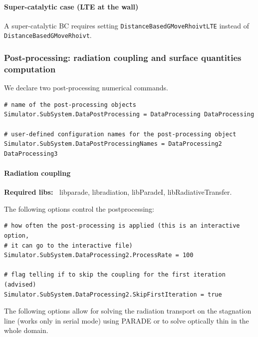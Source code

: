 \documentclass[11pt]{article}
\begin{document}
\paragraph{Super-catalytic case (LTE at the wall)}

A super-catalytic BC requires setting {\tt DistanceBasedGMoveRhoivtLTE} instead of  
{\tt DistanceBasedGMoveRhoivt}.

\subsubsection{Post-processing: radiation coupling and surface quantities computation}

We declare two post-processing numerical commands.

\begin{verbatim}
# name of the post-processing objects
Simulator.SubSystem.DataPostProcessing = DataProcessing DataProcessing

# user-defined configuration names for the post-processing object 
Simulator.SubSystem.DataPostProcessingNames = DataProcessing2 DataProcessing3
\end{verbatim}

\paragraph{Radiation coupling}

{\bf Required libs:~} libparade, libradiation, libParadeI, libRadiativeTransfer.

The following options control the postprocessing:

\begin{verbatim}
# how often the post-processing is applied (this is an interactive option, 
# it can go to the interactive file)
Simulator.SubSystem.DataProcessing2.ProcessRate = 100

# flag telling if to skip the coupling for the first iteration (advised)
Simulator.SubSystem.DataProcessing2.SkipFirstIteration = true
\end{verbatim}

The following options allow for solving the radiation transport on the stagnation line (works only in serial mode) 
using PARADE or to solve optically thin in the whole domain.
\end{document}
